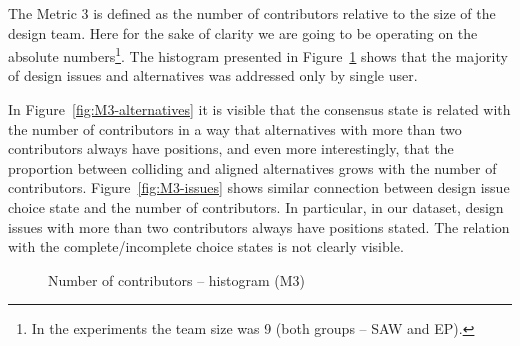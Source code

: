 \documentclass[article]{elsarticle}
\begin{document}
The Metric 3 is defined as the number of contributors relative to the size of the design team. Here for the sake of clarity we are going to be operating on the absolute numbers\footnote{In the experiments the team size was 9 (both groups -- SAW and EP).}. The histogram presented in Figure~\ref{fig:M3-histogram} shows that the majority of design issues and alternatives was addressed only by single user. 

In Figure~\ref{fig:M3-alternatives} it is visible that the consensus state is related with the number of contributors in a way that alternatives with more than two contributors always have positions, and even more interestingly, that the proportion between colliding and aligned alternatives grows with the number of contributors. Figure~\ref{fig:M3-issues} shows similar connection between design issue choice state and the number of contributors. In particular, in our dataset, design issues with more than two contributors always have positions stated. The relation with the complete/incomplete choice states is not clearly visible. 
\begin{figure}
  \begin{center}  
  \caption{Number of contributors -- histogram (M3)}
  \label{fig:M3-histogram}
  \end{center}
\end{figure}
\end{document}
